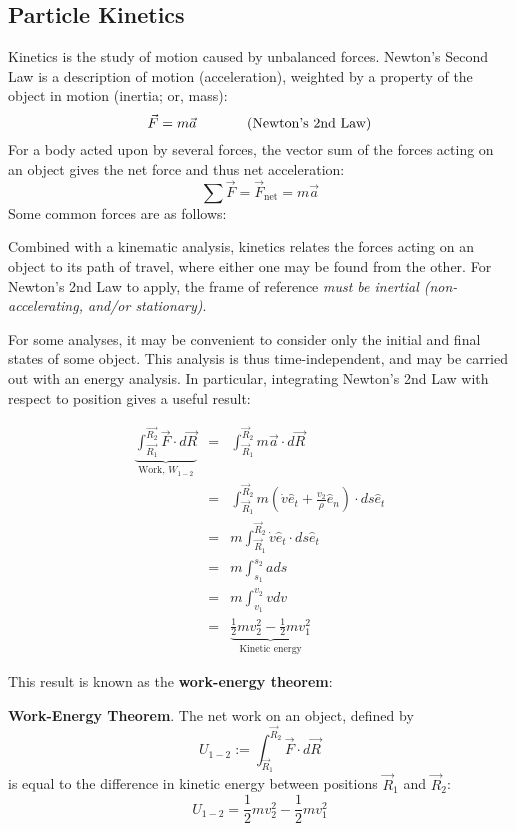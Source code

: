 

\subsection{Particle Kinetics} %

Kinetics is the study of motion caused by unbalanced forces. Newton's Second Law is a description of motion (acceleration), weighted by a property of the object in motion (inertia; or, mass): \[\vec{F} = m\vec{a}\hspace{0.5in}\text{(Newton's 2nd Law)}\] For a body acted upon by several forces, the vector sum of the forces acting on an object gives the net force and thus net acceleration: \[\sum \vec{F} = \vec{F}_\text{net} = m\vec{a}\] Some common forces are as follows:

Combined with a kinematic analysis, kinetics relates the forces acting on an object to its path of travel, where either one may be found from the other. For Newton's 2nd Law to apply, the frame of reference \textit{must be inertial (non-accelerating, and/or stationary)}.

\newpage

For some analyses, it may be convenient to consider only the initial and final states of some object. This analysis is thus time-independent, and may be carried out with an energy analysis. In particular, integrating Newton's 2nd Law with respect to position gives a useful result:

\begin{eqnarray*}
    \underbrace{\int_{\vec{R_1}}^{\vec{R_2}} \vec{F}\cdot d\vec{R}}_{\text{Work, }W_{1-2}} &=& \int_{\vec{R}_1}^{\vec{R}_2} m\vec{a}\cdot d\vec{R}\\
    &=& \int_{\vec{R}_1}^{\vec{R}_2} m(\dot v \hat e_t + \frac{v_2}{\rho}\hat e_n)\cdot ds\hat e_t\\
    &=& m\int_{\vec{R}_1}^{\vec{R}_2}\dot v \hat e_t \cdot ds \hat e_t\\
    &=& m\int_{s_1}^{s_2} a ds\\
    &=& m\int_{v_1}^{v_2} vdv\\
    &=& \underbrace{\frac{1}{2}mv_2^2 - \frac{1}{2}mv_1^2}_{\text{Kinetic energy}}
\end{eqnarray*}

This result is known as the \textbf{work-energy theorem}:
\begin{shaded}
    \textbf{Work-Energy Theorem}. The net work on an object, defined by \[U_{1-2}:=\int_{\vec{R}_1}^{\vec{R}_2} \vec{F}\cdot d\vec{R}\] is equal to the difference in kinetic energy between positions $\vec{R}_1$ and $\vec{R}_2$: \[U_{1-2} = \frac{1}{2}mv_2^2 - \frac{1}{2}mv_1^2\]
\end{shaded}

